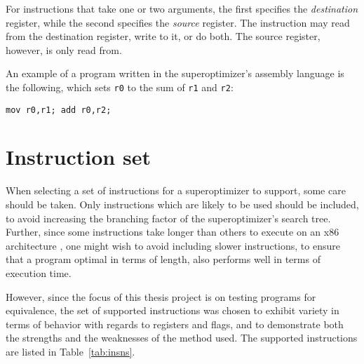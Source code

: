 \documentclass[a4paper,11pt]{kth-mag}
\begin{document}
For instructions that take one or two arguments, the first specifies the \emph{destination} register, while the second specifies the \emph{source} register.
The instruction may read from the destination register, write to it, or do both.
The source register, however, is only read from.

An example of a program written in the superoptimizer's assembly language is the following, which sets \verb|r0| to the sum of \verb|r1| and \verb|r2|:

\begin{verbatim}
mov r0,r1; add r0,r2;
\end{verbatim}

\section{Instruction set}

When selecting a set of instructions for a superoptimizer to support, some care should be taken.
Only instructions which are likely to be used should be included, to avoid increasing the branching factor of the superoptimizer's search tree.
Further, since some instructions take longer than others to execute on an x86 architecture \cite{x86_timing}, one might wish to avoid including slower instructions, to ensure that a program optimal in terms of length, also performs well in terms of execution time.

However, since the focus of this thesis project is on testing programs for equivalence, the set of supported instructions was chosen to exhibit variety in terms of behavior with regards to registers and flags, and to demonstrate both the strengths and the weaknesses of the method used. The supported instructions are listed in Table~\ref{tab:insns}.
\end{document}

